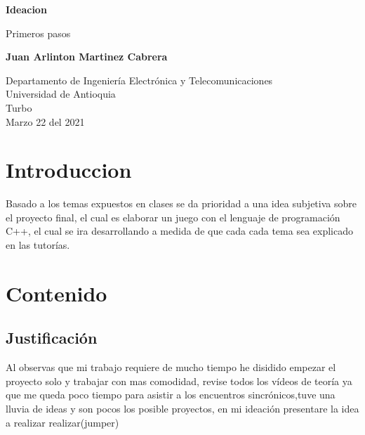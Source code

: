 \documentclass{article}
\begin{document}
\begin{titlepage}
    \begin{center}
        \vspace*{1cm}
            
        \Huge
        \textbf{Ideacion}
            
        \vspace{0.5cm}
        \LARGE
        Primeros pasos
            
        \vspace{1.5cm}
            
        \textbf{Juan Arlinton Martinez Cabrera}
            
        \vfill
            
        \vspace{0.8cm}
            
        \Large
        Departamento de Ingeniería Electrónica y Telecomunicaciones\\
        Universidad de Antioquia\\
        Turbo\\
        Marzo 22 del 2021
            
    \end{center}
\end{titlepage}

\tableofcontents
\newpage
\section{Introduccion}\label{intro}
Basado a los temas expuestos en clases se da prioridad a una idea subjetiva sobre el proyecto final, el cual es elaborar un juego con el lenguaje de programación C++, el cual se ira desarrollando a medida de que cada cada tema sea explicado en las tutorías.

\section{Contenido} \label{contenido}
 
\subsection{Justificación}
Al observas que mi trabajo requiere de mucho tiempo he disidido empezar el proyecto solo y trabajar con mas comodidad, revise todos los vídeos de teoría ya que me queda poco tiempo para asistir a los encuentros sincrónicos,tuve una lluvia de ideas y son pocos los posible proyectos, en mi ideación presentare la idea a realizar realizar(jumper)
\end{document}
